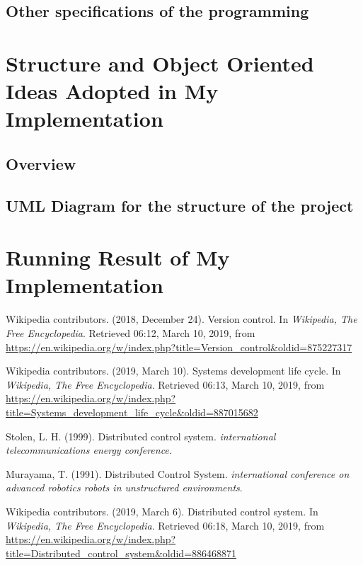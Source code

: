 \documentclass[a4paper]{report}
\begin{document}
\section{Other specifications of the programming}












\chapter{Structure and Object Oriented Ideas Adopted in My Implementation}
\section{Overview}



\section{UML Diagram for the structure of the project}








\chapter{Running Result of My Implementation}






\begin{thebibliography}{A}

Wikipedia contributors. (2018, December 24). Version control. In \emph{Wikipedia, The Free Encyclopedia}. Retrieved 06:12, March 10, 2019, from \url{https://en.wikipedia.org/w/index.php?title=Version_control&oldid=875227317}

Wikipedia contributors. (2019, March 10). Systems development life cycle. In \emph{Wikipedia, The Free Encyclopedia}. Retrieved 06:13, March 10, 2019, from \url{https://en.wikipedia.org/w/index.php?title=Systems_development_life_cycle&oldid=887015682}

Stolen, L. H. (1999). Distributed control system. \emph{international telecommunications energy conference.}

Murayama, T. (1991). Distributed Control System. \emph{international conference on advanced robotics robots in unstructured environments}.

Wikipedia contributors. (2019, March 6). Distributed control system. In \emph{Wikipedia, The Free Encyclopedia}. Retrieved 06:18, March 10, 2019, from \url{https://en.wikipedia.org/w/index.php?title=Distributed_control_system&oldid=886468871}

\end{thebibliography}
\end{document}
